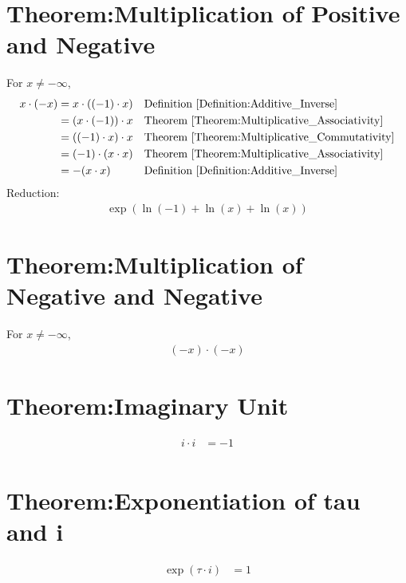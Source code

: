 \documentclass[12pt,a4paper]{report}
\begin{document}
\section{Theorem:Multiplication of Positive and Negative}
\label{Theorem:Multiplication_of_Positive_and_Negative}
For $x \neq -\infty$,
\begin{align*}
x \cdot (-x)
&= x \cdot ((-1) \cdot x)
&& \text{Definition \ref{Definition:Additive_Inverse}} \\
&= (x \cdot (-1)) \cdot x
&& \text{Theorem \ref{Theorem:Multiplicative_Associativity}} \\
&= ((-1) \cdot x) \cdot x
&& \text{Theorem \ref{Theorem:Multiplicative_Commutativity}} \\
&= (-1) \cdot (x \cdot x)
&& \text{Theorem \ref{Theorem:Multiplicative_Associativity}} \\
&= - (x \cdot x)
&& \text{Definition \ref{Definition:Additive_Inverse}} \\
\end{align*}
Reduction:
\begin{align*}
\exp(\ln(-1) + \ln(x) + \ln(x))
\end{align*}

\section{Theorem:Multiplication of Negative and Negative}
\label{Theorem:Multiplication_of_Negative_and_Negative}
For $x \neq -\infty$,
\begin{align*}
(-x) \cdot (-x)
\end{align*}

\section{Theorem:Imaginary Unit}
\label{Theorem:Imaginary_Unit}
\begin{align*}
i \cdot i &= -1 \\
\end{align*}

\section{Theorem:Exponentiation of tau and i}
\label{Theorem:Exponentiation_of_tau_i}
\begin{align*}
\exp (\tau \cdot i) &= 1 \\
\end{align*}
\end{document}
